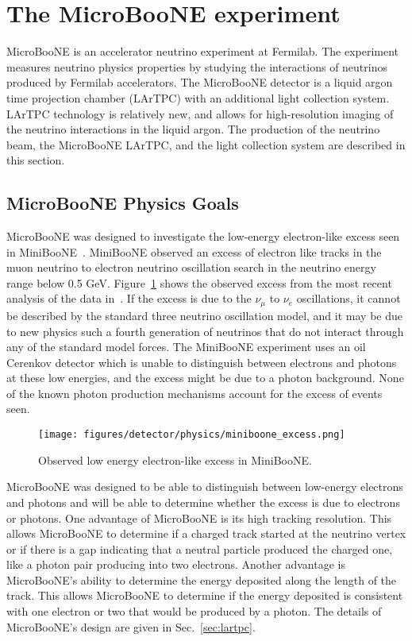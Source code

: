 \section{The MicroBooNE experiment}\label{microboone}
MicroBooNE is an accelerator neutrino experiment at Fermilab. The experiment
measures neutrino physics properties by studying the interactions of neutrinos
produced by Fermilab accelerators. The MicroBooNE detector is a liquid argon
time projection chamber (LArTPC) with an additional light collection system.
LArTPC technology is relatively new, and allows for high-resolution imaging of
the neutrino interactions in the liquid argon. The production of the neutrino
beam, the MicroBooNE LArTPC, and the light collection system are described in
this section.
\subsection{MicroBooNE Physics Goals}\label{sec:uboonephysics}
  MicroBooNE was designed to investigate the low-energy electron-like excess
  seen in MiniBooNE~\cite{Aguilar-Arevalo:2010wv,Aguilar-Arevalo:2018gpe}.
  MiniBooNE observed an excess of electron like tracks in the muon neutrino to
  electron neutrino oscillation search in the neutrino energy range below 0.5
  GeV. Figure~\ref{fig:miniboonelee} shows the observed excess from the most
  recent analysis of the data in~\cite{Aguilar-Arevalo:2018gpe}. If the excess
  is due to the $\nu_{\mu}$ to $\nu_e$ oscillations, it cannot be described by
  the standard three neutrino oscillation model, and it may be due to new
  physics such a fourth generation of neutrinos that do not interact through
  any of the standard model forces.  The MiniBooNE experiment uses an oil
  Cerenkov detector which is unable to distinguish between electrons and
  photons at these low energies, and the excess might be due to a photon
  background. None of the known photon production mechanisms account for the
  excess of events seen.

  \begin{figure}[h]
    \centering
    \texttt{[image: figures/detector/physics/miniboone\_excess.png]}
    \caption{Observed low energy electron-like excess in MiniBooNE.}
    \label{fig:miniboonelee}
  \end{figure}

  MicroBooNE was designed to be able to distinguish between low-energy
  electrons and photons and will be able to determine whether the excess is due
  to electrons or photons. One advantage of MicroBooNE is its high tracking
  resolution. This allows MicroBooNE to determine if a charged track started at
  the neutrino vertex or if there is a gap indicating that a neutral particle
  produced the charged one, like a photon pair producing into two electrons.
  Another advantage is MicroBooNE's ability to determine the energy deposited
  along the length of the track. This allows MicroBooNE to determine if the
  energy deposited is consistent with one electron or two that would be
  produced by a photon. The details of MicroBooNE's design are given in
  Sec.~\ref{sec:lartpc}.

